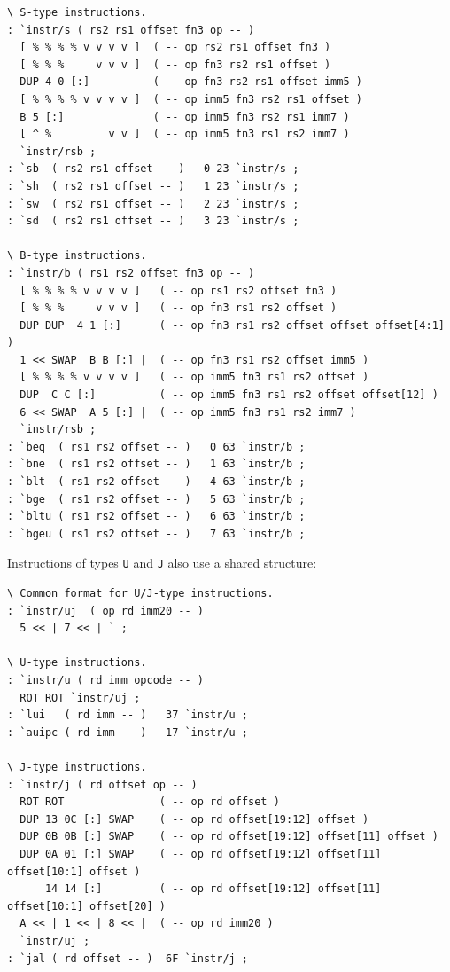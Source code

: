 \documentclass[a4paper,12pt,final]{article}
\begin{document}
\fontsize{9pt}{9.000000pt}\selectfont
\begin{verbatim}
\ S-type instructions.
: `instr/s ( rs2 rs1 offset fn3 op -- )
  [ % % % % v v v v ]  ( -- op rs2 rs1 offset fn3 )
  [ % % %     v v v ]  ( -- op fn3 rs2 rs1 offset )
  DUP 4 0 [:]          ( -- op fn3 rs2 rs1 offset imm5 )
  [ % % % % v v v v ]  ( -- op imm5 fn3 rs2 rs1 offset )
  B 5 [:]              ( -- op imm5 fn3 rs2 rs1 imm7 )
  [ ^ %         v v ]  ( -- op imm5 fn3 rs1 rs2 imm7 )
  `instr/rsb ;
: `sb  ( rs2 rs1 offset -- )   0 23 `instr/s ;
: `sh  ( rs2 rs1 offset -- )   1 23 `instr/s ;
: `sw  ( rs2 rs1 offset -- )   2 23 `instr/s ;
: `sd  ( rs2 rs1 offset -- )   3 23 `instr/s ;

\ B-type instructions.
: `instr/b ( rs1 rs2 offset fn3 op -- )
  [ % % % % v v v v ]   ( -- op rs1 rs2 offset fn3 )
  [ % % %     v v v ]   ( -- op fn3 rs1 rs2 offset )
  DUP DUP  4 1 [:]      ( -- op fn3 rs1 rs2 offset offset offset[4:1] )
  1 << SWAP  B B [:] |  ( -- op fn3 rs1 rs2 offset imm5 )
  [ % % % % v v v v ]   ( -- op imm5 fn3 rs1 rs2 offset )
  DUP  C C [:]          ( -- op imm5 fn3 rs1 rs2 offset offset[12] )
  6 << SWAP  A 5 [:] |  ( -- op imm5 fn3 rs1 rs2 imm7 )
  `instr/rsb ;
: `beq  ( rs1 rs2 offset -- )   0 63 `instr/b ;
: `bne  ( rs1 rs2 offset -- )   1 63 `instr/b ;
: `blt  ( rs1 rs2 offset -- )   4 63 `instr/b ;
: `bge  ( rs1 rs2 offset -- )   5 63 `instr/b ;
: `bltu ( rs1 rs2 offset -- )   6 63 `instr/b ;
: `bgeu ( rs1 rs2 offset -- )   7 63 `instr/b ;
\end{verbatim}
\normalsize

Instructions of types \texttt{U} and \texttt{J} also use a shared structure:

\fontsize{9pt}{9.000000pt}\selectfont
\begin{verbatim}
\ Common format for U/J-type instructions.
: `instr/uj  ( op rd imm20 -- )
  5 << | 7 << | ` ;

\ U-type instructions.
: `instr/u ( rd imm opcode -- )
  ROT ROT `instr/uj ;
: `lui   ( rd imm -- )   37 `instr/u ;
: `auipc ( rd imm -- )   17 `instr/u ;

\ J-type instructions.
: `instr/j ( rd offset op -- )
  ROT ROT               ( -- op rd offset )
  DUP 13 0C [:] SWAP    ( -- op rd offset[19:12] offset )
  DUP 0B 0B [:] SWAP    ( -- op rd offset[19:12] offset[11] offset )
  DUP 0A 01 [:] SWAP    ( -- op rd offset[19:12] offset[11] offset[10:1] offset )
      14 14 [:]         ( -- op rd offset[19:12] offset[11] offset[10:1] offset[20] )
  A << | 1 << | 8 << |  ( -- op rd imm20 )
  `instr/uj ;
: `jal ( rd offset -- )  6F `instr/j ;
\end{verbatim}
\normalsize
\end{document}
